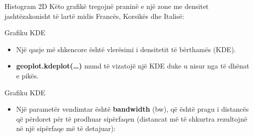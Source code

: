 \documentclass[
  ignorenonframetext,
]{beamer}
\providecommand{\tightlist}{%
  \setlength{\itemsep}{0pt}\setlength{\parskip}{0pt}}
\begin{document}
\begin{frame}{Histogram 2D}
\protect\hypertarget{histogram-2d-3}{}
Këto grafikë tregojnë praninë e një zone me densitet jashtëzakonisht të
lartë midis Francës, Korsikës dhe Italisë:
\end{frame}

\begin{frame}{Grafiku KDE}
\protect\hypertarget{grafiku-kde}{}
\begin{itemize}
\item
  Një qasje më shkencore është vlerësimi i densitetit të bërthamës
  (KDE).
\item
  \textbf{geoplot.kdeplot(\ldots)} mund të vizatojë një KDE duke u nisur
  nga të dhënat e pikës.
\end{itemize}
\end{frame}

\begin{frame}{Grafiku KDE}
\protect\hypertarget{grafiku-kde-1}{}
\begin{itemize}
\tightlist
\item
  Një parametër vendimtar është \textbf{bandwidth} (bw), që është pragu
  i distancës që përdoret për të prodhuar sipërfaqen (distancat më të
  shkurtra rezultojnë në një sipërfaqe më të detajuar):
\end{itemize}
\end{frame}
\end{document}
